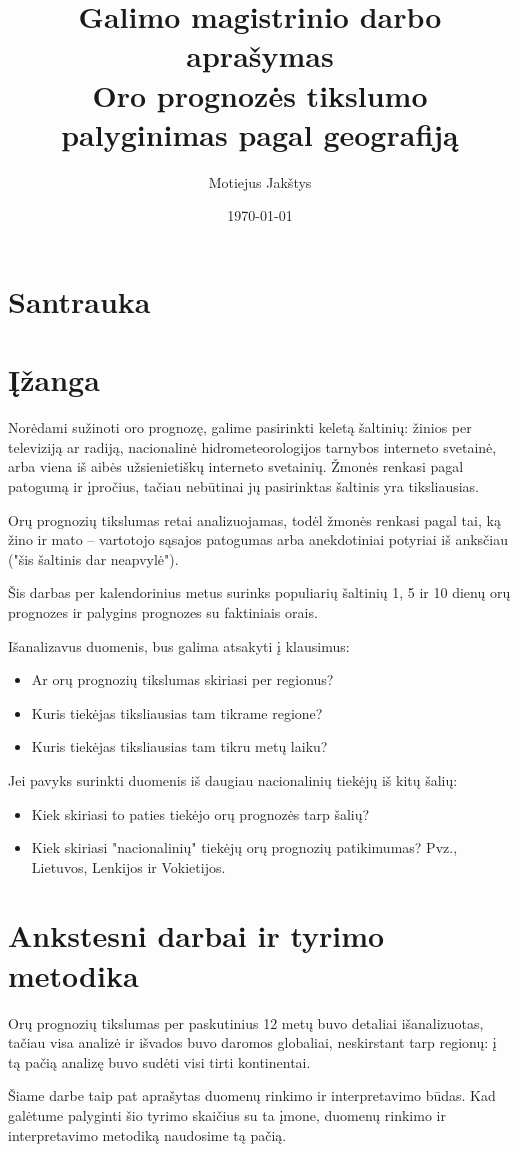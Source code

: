 \documentclass{article}
\title{Galimo magistrinio darbo aprašymas\\ \vspace{4mm} 
Oro prognozės tikslumo palyginimas pagal geografiją}
\author{Motiejus Jakštys}
\date{\today}
\begin{document}
\maketitle

\section{Santrauka}

\section{Įžanga}
Norėdami sužinoti oro prognozę, galime pasirinkti keletą šaltinių: žinios per
televiziją ar radiją, nacionalinė hidrometeorologijos tarnybos interneto
svetainė, arba viena iš aibės užsienietiškų interneto svetainių. Žmonės renkasi
pagal patogumą ir įpročius, tačiau nebūtinai jų pasirinktas šaltinis yra
tiksliausias.

Orų prognozių tikslumas retai analizuojamas, todėl žmonės renkasi pagal tai, ką
žino ir mato -- vartotojo sąsajos patogumas arba anekdotiniai potyriai iš
anksčiau ("šis šaltinis dar neapvylė").

Šis darbas per kalendorinius metus surinks populiarių šaltinių 1, 5 ir 10 dienų
orų prognozes ir palygins prognozes su faktiniais orais.

Išanalizavus duomenis, bus galima atsakyti į klausimus:
\begin{itemize}
    \item Ar orų prognozių tikslumas skiriasi per regionus?
    \item Kuris tiekėjas tiksliausias tam tikrame regione?
    \item Kuris tiekėjas tiksliausias tam tikru metų laiku?
\end{itemize}

Jei pavyks surinkti duomenis iš daugiau nacionalinių tiekėjų iš kitų šalių:
\begin{itemize}
    \item Kiek skiriasi to paties tiekėjo orų prognozės tarp šalių?
    \item Kiek skiriasi "nacionalinių" tiekėjų orų prognozių patikimumas? Pvz.,
        Lietuvos, Lenkijos ir Vokietijos.
\end{itemize}

\section{Ankstesni darbai ir tyrimo metodika}

Orų prognozių tikslumas per paskutinius 12 metų buvo detaliai
išanalizuotas\cite{rose2017analysis}, tačiau visa analizė ir išvados buvo
daromos globaliai, neskirstant tarp regionų: į tą pačią analizę buvo sudėti
visi tirti kontinentai.

Šiame darbe taip pat aprašytas duomenų rinkimo ir interpretavimo būdas. Kad
galėtume palyginti šio tyrimo skaičius su ta įmone, duomenų rinkimo ir
interpretavimo metodiką naudosime tą pačią.

{}

\end{document}
